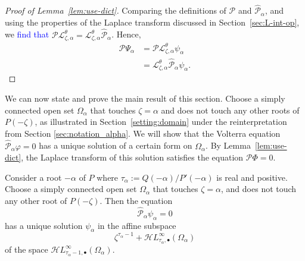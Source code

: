\documentclass[review]{siamart220329}
\newcommand{\laplace}{\mathcal{L}}
\newcommand{\singexp}[2]{\mathcal{H}L^\infty_{#1, #2}}
\newcommand{\singexpalg}[1]{\singexp{#1}{\bullet}}
\newcommand{\domain}{\Omega}
\begin{document}
\begin{proof}[Proof of Lemma~\ref{lem:use-dict}]
Comparing the definitions of $\mathcal{P}$ and $\hat{\mathcal{P}}_\alpha$, and using the properties of the Laplace transform discussed in Section~\ref{sec:L-int-op}, we \textcolor{blue}{find that} $\mathcal{P} \laplace_{\zeta,\alpha}^\theta = \laplace_{\zeta,\alpha}^\theta \hat{\mathcal{P}}_\alpha$. Hence,
\begin{align*}
\mathcal{P}\Psi_\alpha & = \mathcal{P}\laplace_{\zeta,\alpha}^{\theta}\psi_\alpha \\
& = \laplace_{\zeta,\alpha}^{\theta}\hat{\mathcal{P}}_\alpha\psi_\alpha.
\end{align*}
\end{proof}

We can now state and prove the main result of this section. Choose a simply connected open set $\domain_\alpha$ that touches $\zeta = \alpha$ and does not touch any other roots of $P(-\zeta)$, as illustrated in Section~\ref{setting:domain} under the reinterpretation from Section \ref{sec:notation_alpha}. We will show that the Volterra equation $\hat{\mathcal{P}}_\alpha \varphi = 0$ has a unique solution of a certain form on $\domain_\alpha$. By Lemma~\ref{lem:use-dict}, the Laplace transform of this solution satisfies the equation $\mathcal{P}\Phi = 0$.
\begin{theorem}\label{thm:example}
Consider a root $-\alpha$ of $P$ where $\tau_\alpha := Q(-\alpha)/P'(-\alpha)$ is real and positive. Choose a simply connected open set $\domain_\alpha$ that touches
$\zeta = \alpha$, and does not touch any other root of $P(-\zeta)$. Then the equation
\[ \hat{\mathcal{P}}_\alpha \psi_\alpha = 0 \]
has a unique solution $\psi_\alpha$ in the affine subspace
\[ \zeta^{\tau_\alpha-1} + \singexpalg{\tau_\alpha}(\domain_\alpha) \]
of the space $\singexpalg{\tau_\alpha-1}(\domain_\alpha)$.
\end{theorem}
\end{document}

